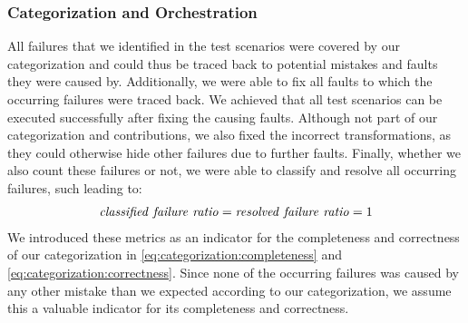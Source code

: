 


\subsubsection{Categorization and Orchestration}

All failures that we identified in the test scenarios were covered by our categorization and could thus be traced back to potential mistakes and faults they were caused by.
Additionally, we were able to fix all faults to which the occurring failures were traced back.
We achieved that all test scenarios can be executed successfully after fixing the causing faults.
Although not part of our categorization and contributions, we also fixed the incorrect transformations, as they could otherwise hide other failures due to further faults.
Finally, whether we also count these failures or not, we were able to classify and resolve all occurring failures, such leading to:
\begin{align*}
    \mathvariable{classified\ failure\ ratio} = \mathvariable{resolved\ failure\ ratio}= 1
\end{align*}
We introduced these metrics as an indicator for the completeness and correctness of our categorization in \autoref{eq:categorization:completeness} and \autoref{eq:categorization:correctness}.
Since none of the occurring failures was caused by any other mistake than we expected according to our categorization, we assume this a valuable indicator for its completeness and correctness.


